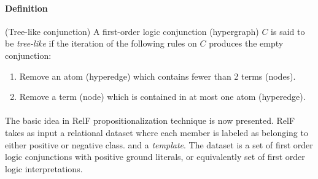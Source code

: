 \documentclass[11pt,twoside,a4paper]{book}
\newcounter{Definition}
\begin{document}
\paragraph{Definition}   (Tree-like conjunction) A first-order logic conjunction (hypergraph) $C$
is said to be \emph{tree-like} if the iteration of the following rules on $C$
produces the empty conjunction:
\begin{enumerate}
 \item Remove an atom (hyperedge) which contains fewer than 2 terms (nodes).
 \item Remove a term (node) which is contained in at most one atom (hyperedge).
\end{enumerate}


\paragraph{ } The basic idea in RelF propositionalization technique is now presented.
RelF takes as input a relational dataset
where each member is labeled as belonging to either positive or negative class.
and a \emph{template}. 
The dataset is a set of first order logic conjunctions with positive ground literals,
or equivalently set of first order logic interpretations.
\end{document}
